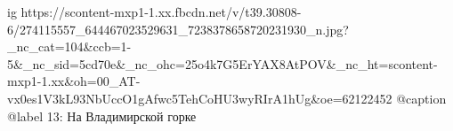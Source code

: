  
 
 
 
 

\ifcmt
  ig https://scontent-mxp1-1.xx.fbcdn.net/v/t39.30808-6/274115557_644467023529631_7238378658720231930_n.jpg?_nc_cat=104&ccb=1-5&_nc_sid=5cd70e&_nc_ohc=25o4k7G5ErYAX8AtPOV&_nc_ht=scontent-mxp1-1.xx&oh=00_AT-vx0es1V3kL93NbUccO1gAfwc5TehCoHU3wyRIrA1hUg&oe=62122452
  @caption @label 13: На Владимирской горке
\fi
